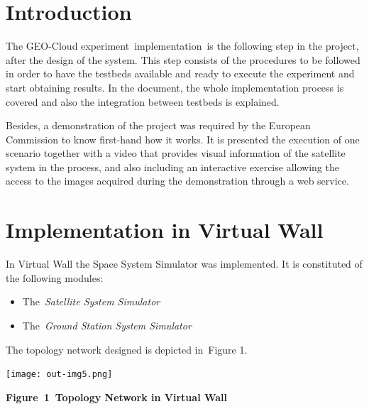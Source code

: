 \documentclass[a4paper]{article}
\newcommand\liststyleLFOxlii{%
\renewcommand\theenumi{\arabic{enumi}}
\renewcommand\labelitemi{[F0B7?]}
\renewcommand\labelenumi{\theenumi.}
\renewcommand\labelitemii{[F0A7?]}
\renewcommand\labelitemiii{[F0B7?]}
}
\begin{document}
\bigskip

\setcounter{tocdepth}{3}
\tableofcontents

\bigskip

\section[Introduction]{Introduction}
\hypertarget{Toc390097010}{}
\bigskip

The GEO-Cloud experiment\ implementation\ is the following step in the
project, after the design of the system. This step consists of the
procedures to be followed in order to have the testbeds available and
ready to execute the experiment and start obtaining results. In the
document, the whole implementation process is covered and also the
integration between testbeds is explained.


\bigskip

Besides, a demonstration of the project was required by the European
Commission to know first-hand how it works. It is presented the
execution of one scenario together with a video that provides visual
information of the satellite system in the process, and also including
an interactive exercise allowing the access to the images acquired
during the demonstration through a web service.

\section[Implementation in Virtual Wall]{Implementation in Virtual Wall}
\hypertarget{Toc390097011}{}
\bigskip

In Virtual Wall the Space System Simulator was implemented. It is
constituted of the following modules:

\liststyleLFOxlii
\begin{itemize}
\item The\ \textit{Satellite System Simulator}
\item The\ \textit{Ground Station System Simulator}
\end{itemize}

\bigskip

The topology network designed is depicted in\ Figure 1.


\bigskip

{\centering 
\texttt{[image: out-img5.png]} \par}

{\centering\bfseries
\label{bkm:Ref390072131}Figure\ 1\ Topology Network in Virtual Wall
\par}
\end{document}
